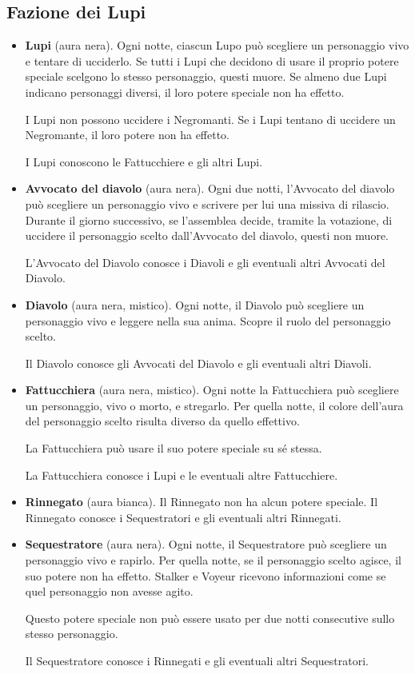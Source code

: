 \documentclass[a4paper,10pt]{article}
\begin{document}
\subsection*{Fazione dei Lupi}

\begin{itemize}
 \item {\bf Lupi} (aura nera). Ogni notte, ciascun Lupo può scegliere un
personaggio vivo e tentare di ucciderlo.
 Se tutti i Lupi che decidono di usare il proprio potere speciale scelgono lo
stesso personaggio, questi muore.
 Se almeno due Lupi indicano personaggi diversi, il loro potere speciale non ha
effetto.
 
 I Lupi non possono uccidere i Negromanti. Se i Lupi tentano di uccidere un
Negromante, il loro potere non ha effetto.
 
 I Lupi conoscono le Fattucchiere e gli altri Lupi.

 \item {\bf Avvocato del diavolo} (aura nera). Ogni due notti, l'Avvocato del
diavolo può scegliere un personaggio vivo e scrivere per lui una missiva di
rilascio.
 Durante il giorno successivo, se l'assemblea decide, tramite la votazione, di
uccidere il personaggio scelto dall'Avvocato del diavolo, questi non muore.
 
 L'Avvocato del Diavolo conosce i Diavoli e gli eventuali altri Avvocati del
Diavolo.

 \item {\bf Diavolo} (aura nera, mistico). Ogni notte, il Diavolo può scegliere
un personaggio vivo e leggere nella sua anima. Scopre il ruolo del personaggio
scelto.
 
 Il Diavolo conosce gli Avvocati del Diavolo e gli eventuali altri Diavoli.
 
 \item {\bf Fattucchiera} (aura nera, mistico). Ogni notte la Fattucchiera può scegliere
un personaggio, vivo o morto, e stregarlo. Per quella notte, il colore dell'aura
del personaggio scelto risulta diverso da quello effettivo.
 
 La Fattucchiera può usare il suo potere speciale su sé stessa.
 
 La Fattucchiera conosce i Lupi e le eventuali altre Fattucchiere.
 
 \item {\bf Rinnegato} (aura bianca). Il Rinnegato non ha alcun potere speciale.
Il Rinnegato conosce i Sequestratori e gli eventuali altri Rinnegati.

 \item {\bf Sequestratore} (aura nera). Ogni notte, il Sequestratore può
scegliere un personaggio vivo e rapirlo. Per quella notte, se il personaggio
scelto agisce, il suo potere non ha effetto.
 Stalker e Voyeur ricevono informazioni come se quel personaggio non avesse
agito.
 
 Questo potere speciale non può essere usato per due notti consecutive sullo
stesso personaggio.
 
 Il Sequestratore conosce i Rinnegati e gli eventuali altri Sequestratori.


\end{itemize}
\end{document}
